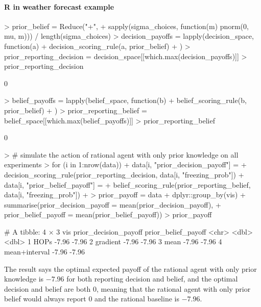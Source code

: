 \documentclass{article}
\begin{document}
\paragraph{R in weather forecast example}

\begin{Schunk}
\begin{Sinput}
> prior_belief = Reduce("+", 
+   sapply(sigma_choices, function(m) {pnorm(0, mu, m)})) / length(sigma_choices)
> decision_payoffs = lapply(decision_space, function(a) {
+   decision_scoring_rule(a, prior_belief)
+ })
> prior_reporting_decision = decision_space[[which.max(decision_payoffs)]]
> prior_reporting_decision
\end{Sinput}
\begin{Soutput}
[1] 0
\end{Soutput}
\begin{Sinput}
> belief_payoffs = lapply(belief_space, function(b) {
+   belief_scoring_rule(b, prior_belief)
+ })
> prior_reporting_belief = belief_space[[which.max(belief_payoffs)]]
> prior_reporting_belief
\end{Sinput}
\begin{Soutput}
[1] 0
\end{Soutput}
\begin{Sinput}
> # simulate the action of rational agent with only prior knowledge on all experiments
> for (i in 1:nrow(data)) {
+   data[i, "prior_decision_payoff"] = 
+     decision_scoring_rule(prior_reporting_decision, data[i, "freezing_prob"])
+   data[i, "prior_belief_payoff"] = 
+     belief_scoring_rule(prior_reporting_belief, data[i, "freezing_prob"])
+ }
> prior_payoff = data %>%
+   dplyr::group_by(vis) %>%
+   summarise(prior_decision_payoff = mean(prior_decision_payoff),
+             prior_belief_payoff = mean(prior_belief_payoff))
> prior_payoff
\end{Sinput}
\begin{Soutput}
# A tibble: 4 × 3
  vis           prior_decision_payoff prior_belief_payoff
  <chr>                         <dbl>               <dbl>
1 HOPs                          -7.96               -7.96
2 gradient                      -7.96               -7.96
3 mean                          -7.96               -7.96
4 mean+interval                 -7.96               -7.96
\end{Soutput}
\end{Schunk}

The result says the optimal expected payoff of the rational agent with only prior knowledge is $-7.96$ for both reporting decision and belief, and the optimal decision and belief are both $0$, meaning that the rational agent with only prior belief would always report $0$ and the rational baseline is $-7.96$.
\end{document}
